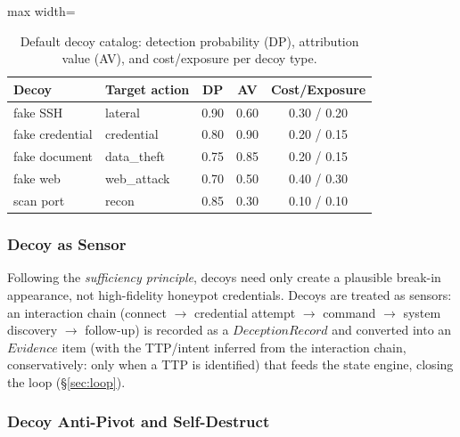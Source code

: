 \documentclass[11pt]{article}
\begin{document}
\begin{table}[ht]
\centering
\begin{adjustbox}{max width=\linewidth}\begin{tabular}{@{}llccc@{}}
\toprule
\textbf{Decoy} & \textbf{Target action} & \textbf{DP} & \textbf{AV} & \textbf{Cost/Exposure} \\
\midrule
fake SSH & lateral & 0.90 & 0.60 & 0.30 / 0.20 \\
fake credential & credential & 0.80 & 0.90 & 0.20 / 0.15 \\
fake document & data\_theft & 0.75 & 0.85 & 0.20 / 0.15 \\
fake web & web\_attack & 0.70 & 0.50 & 0.40 / 0.30 \\
scan port & recon & 0.85 & 0.30 & 0.10 / 0.10 \\
\bottomrule
\end{tabular}\end{adjustbox}
\caption{Default decoy catalog: detection probability (DP), attribution
value (AV), and cost/exposure per decoy type.}
\label{tab:decoy}
\end{table}

\subsubsection{Decoy as Sensor}
\label{sec:decoy-mapping}

Following the \textit{sufficiency principle}, decoys need only create a
plausible break-in appearance, not high-fidelity honeypot credentials.
Decoys are treated as sensors: an interaction chain (connect $\to$
credential attempt $\to$ command $\to$ system discovery $\to$ follow-up) is
recorded as a $\mathit{DeceptionRecord}$ and converted into an
$\mathit{Evidence}$ item (with the TTP/intent inferred from the interaction
chain, conservatively: only when a TTP is identified) that feeds the state
engine, closing the loop (\S\ref{sec:loop}).

\subsubsection{Decoy Anti-Pivot and Self-Destruct}
\label{sec:anti-pivot}
\end{document}
